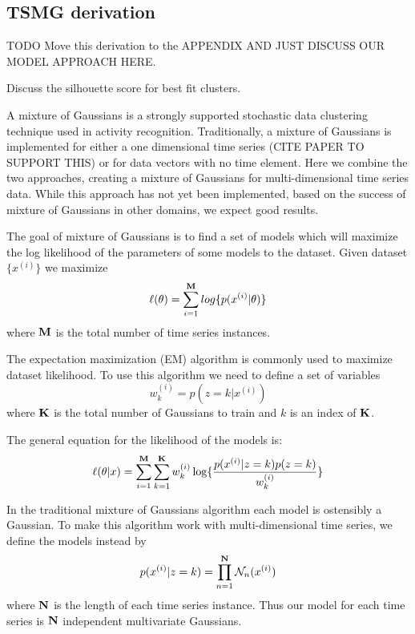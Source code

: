 \subsection{TSMG derivation}
TODO Move this derivation to the APPENDIX AND JUST DISCUSS OUR MODEL APPROACH HERE.

Discuss the silhouette score for best fit clusters.


A mixture of Gaussians is a strongly supported stochastic data clustering technique used in activity recognition.  Traditionally, a mixture of Gaussians is implemented for either a one dimensional time series (CITE PAPER TO SUPPORT THIS) or for data vectors with no time element.  Here we combine the two approaches, creating a mixture of Gaussians for multi-dimensional time series data.  While this approach has not yet been implemented, based on the success of mixture of Gaussians in other domains, we expect good results.

The goal of mixture of Gaussians is to find a set of models which will maximize the log likelihood of the parameters of some models to the dataset.  Given dataset $\{x^{(i)}\}$ we maximize
\begin{equation}
\ell(\theta) = \sum_{i = 1}^{\bf M}log\{p(x^{(i)}|\theta)\}
\end{equation}
\noindent 
where ${\bf M}$ is the total number of time series instances.

The expectation maximization (EM) algorithm is commonly used to maximize dataset likelihood.  To use this algorithm we need to define a set of variables
\begin{equation}
w_{k}^{(i)} = p(z = k|x^{(i)})
\end{equation}
\noindent
where ${\bf K}$ is the total number of Gaussians to train and $k$ is an index of ${\bf K}$.  

The general equation for the likelihood of the models is: 
\begin{equation}
\label{eq:em_likelihood}
\ell(\theta|x) = \sum_{i = 1}^{{\bf M}}\sum_{k = 1}^{{\bf K}}w_{k}^{(i)}\log \{ \frac{p(x^{(i)}|z=k)p(z = k)}{w_{k}^{(i)}} \}
\end{equation}

In the traditional mixture of Gaussians algorithm each model is ostensibly a Gaussian.  To make this algorithm work with multi-dimensional time series, we define the models instead by
\begin{equation}
\label{eq:model}
p(x^{(i)}|z = k) = \prod_{n = 1}^{{\bf N}}\mathcal{N}_{n}(x^{(i)})
\end{equation}
\noindent
where ${\bf N}$ is the length of each time series instance.  Thus our model for each time series is ${\bf N}$ independent multivariate Gaussians.

